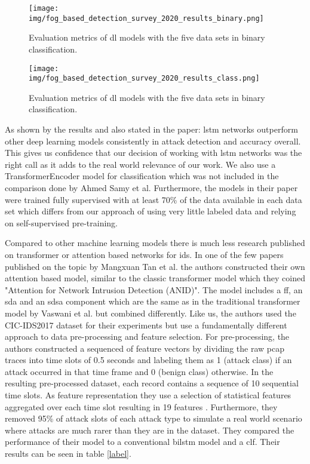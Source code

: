 \begin{figure}[h]
	\centering
	\texttt{[image: img/fog\_based\_detection\_survey\_2020\_results\_binary.png]}
	\caption{Evaluation metrics of \gls{dl} models with the five data sets in binary classification. \cite{fog_based_detection_survey_2020}}
	\label{fig:stateofart:fog_based_detection_survey_2020_results_binary}
\end{figure}

\begin{figure}[h]
	\centering
	\texttt{[image: img/fog\_based\_detection\_survey\_2020\_results\_class.png]}
	\caption{Evaluation metrics of \gls{dl} models with the five data sets in binary classification. \cite{fog_based_detection_survey_2020}}
	\label{fig:stateofart:fog_based_detection_survey_2020_results_class}
\end{figure}

As shown by the results and also stated in the paper: \gls{lstm} networks outperform other deep learning models consistently in attack detection and accuracy overall. This gives us confidence that our decision of working with \gls{lstm} networks was the right call as it adds to the real world relevance of our work. We also use a TransformerEncoder model for classification which was not included in the comparison done by Ahmed Samy et al. Furthermore, the models in their paper were trained fully supervised with at least 70\% of the data available in each data set which differs from our approach of using very little labeled data and relying on self-supervised pre-training.

Compared to other machine learning models there is much less research published on transformer or attention based networks for \gls{ids}. In one of the few papers published on the topic by Mangxuan Tan et al. the authors constructed their own attention based model, similar to the classic transformer model \cite{attention_model_ids} which they coined "Attention for Network Intrusion
Detection (ANID)". The model includes a \gls{ff}, an \gls{sda} and an \gls{sdsa} component which are the same as in the traditional transformer model by Vaswani et al. but combined differently. Like us, the authors used the CIC-IDS2017 dataset for their experiments but use a fundamentally different approach to data pre-processing and feature selection. For pre-processing, the authors constructed a sequenced of feature vectors by dividing the raw pcap traces into time slots of 0.5 seconds and labeling them as 1 (attack class) if an attack occurred in that time frame and 0 (benign class) otherwise. In the resulting pre-processed dataset, each record contains a sequence of 10 sequential time slots. As feature representation they use a selection of statistical features aggregated over each time slot resulting in 19 features \cite{attention_model_ids}.
Furthermore, they removed 95\% of attack slots of each attack type to simulate a real world scenario where attacks are much rarer than they are in the dataset. They compared the performance of their model to a conventional \gls{bilstm} model and a \gls{clf}. Their results can be seen in table \ref{label}.

